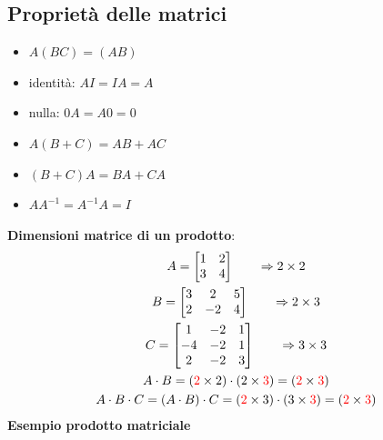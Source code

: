 \documentclass[italian]{article}
\begin{document}
\subsection{Proprietà delle matrici}
\begin{itemize}
	\item $A(BC) = (AB)$
	\item identità: $AI = IA = A$
	\item nulla: $0A = A0 = 0$
	\item $A(B+C) = AB + AC$
	\item $(B+C)A = BA + CA$
	\item $AA^{-1} = A^{-1}A = I$
\end{itemize}
\pagebreak
\textbf{Dimensioni matrice di un prodotto}:
\begin{gather*}
	A =
	\begin{bmatrix}
		1 & 2 \\
		3 & 4
	\end{bmatrix}
	\qquad \Rightarrow  2\times2\\
	B =
	\begin{bmatrix}
		3 & 2 & 5 \\
		2 & -2 & 4
	\end{bmatrix}
	\qquad \Rightarrow 2\times3 \\
	C =
	\begin{bmatrix}
		1 & -2 & 1 \\
		-4 & -2 & 1 \\
		2 & -2 & 3
	\end{bmatrix}
	\qquad \Rightarrow 3\times3 \\
	A\cdot B = (\textcolor{red}{2}\times2) \cdot (2\times\textcolor{red}{3}) = (\textcolor{red}{2}\times\textcolor{red}{3})\\
	A\cdot B\cdot C = (A\cdot B)\cdot C = (\textcolor{red}{2}\times3)\cdot(3\times\textcolor{red}{3}) = (\textcolor{red}{2}\times\textcolor{red}{3})
\end{gather*}
\textbf{Esempio prodotto matriciale}\\
\end{document}
